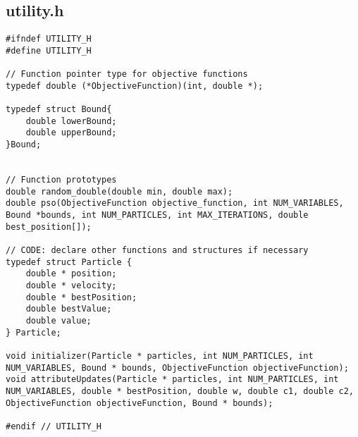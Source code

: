\documentclass[12pt]{article}
\begin{document}
	\subsection{utility.h}
    \begin{lstlisting}
#ifndef UTILITY_H
#define UTILITY_H

// Function pointer type for objective functions
typedef double (*ObjectiveFunction)(int, double *);

typedef struct Bound{
    double lowerBound;
    double upperBound;
}Bound;


// Function prototypes
double random_double(double min, double max);
double pso(ObjectiveFunction objective_function, int NUM_VARIABLES, Bound *bounds, int NUM_PARTICLES, int MAX_ITERATIONS, double best_position[]);

// CODE: declare other functions and structures if necessary
typedef struct Particle {
    double * position; 
    double * velocity; 
    double * bestPosition; 
    double bestValue;
    double value; 
} Particle; 

void initializer(Particle * particles, int NUM_PARTICLES, int NUM_VARIABLES, Bound * bounds, ObjectiveFunction objectiveFunction); 
void attributeUpdates(Particle * particles, int NUM_PARTICLES, int NUM_VARIABLES, double * bestPosition, double w, double c1, double c2, ObjectiveFunction objectiveFunction, Bound * bounds); 

#endif // UTILITY_H
    \end{lstlisting}
	
	
\end{document}
